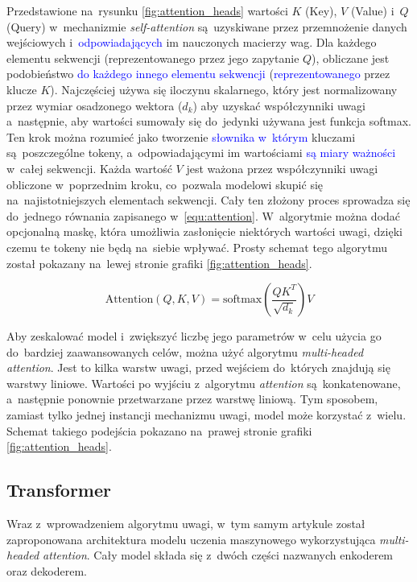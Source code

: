\documentclass[data-science]{agh-wi} %
\begin{document}
Przedstawione na~rysunku \ref*{fig:attention_heads} wartości $K$ (Key), $V$ (Value) i~$Q$ (Query) w~mechanizmie \textit{self-attention} są~uzyskiwane przez przemnożenie danych wejściowych i~\textcolor{blue}{odpowiadających} im nauczonych macierzy wag. Dla każdego elementu sekwencji (reprezentowanego przez jego zapytanie $Q$), obliczane jest podobieństwo \textcolor{blue}{do każdego innego elementu sekwencji} (\textcolor{blue}{reprezentowanego} przez klucze $K$). Najczęściej używa się iloczynu skalarnego, który jest normalizowany przez wymiar osadzonego wektora ($d_k$) aby uzyskać współczynniki uwagi a~następnie, aby wartości sumowały się do~jedynki używana jest funkcja softmax. Ten krok można rozumieć jako tworzenie \textcolor{blue}{słownika w~którym} kluczami są~poszczególne tokeny, a~odpowiadającymi im wartościami \textcolor{blue}{są miary ważności} w~całej sekwencji. Każda wartość $V$ jest ważona przez współczynniki uwagi obliczone w~poprzednim kroku, co~pozwala modelowi skupić się na~najistotniejszych elementach sekwencji. Cały ten złożony proces sprowadza się do~jednego równania zapisanego w~\ref*{equ:attention}. W~algorytmie można dodać opcjonalną maskę, która umożliwia zasłonięcie niektórych wartości uwagi, dzięki czemu te tokeny nie będą na~siebie wpływać. Prosty schemat tego algorytmu został pokazany na~lewej stronie grafiki \ref*{fig:attention_heads}.

\begin{equation}
    \text{Attention}(Q, K, V) = \text{softmax}\left(\dfrac{QK^T}{\sqrt{d_k}}\right)V
    \label{equ:attention}
\end{equation}

Aby zeskalować model i~zwiększyć liczbę jego parametrów w~celu użycia go do~bardziej zaawansowanych celów, można użyć algorytmu \textit{multi-headed attention}. Jest to kilka warstw uwagi, przed wejściem do~których znajdują się warstwy liniowe. Wartości po wyjściu z~algorytmu \textit{attention} są~konkatenowane, a~następnie ponownie przetwarzane przez warstwę liniową. Tym sposobem, zamiast tylko jednej instancji mechanizmu uwagi, model może korzystać z~wielu. Schemat takiego podejścia pokazano na~prawej stronie grafiki \ref*{fig:attention_heads}.

\subsection{Transformer}
Wraz z~wprowadzeniem algorytmu uwagi, w~tym samym artykule został zaproponowana architektura modelu uczenia maszynowego wykorzystująca \textit{multi-headed attention}. Cały model składa się z~dwóch części nazwanych enkoderem oraz dekoderem.
\end{document}
